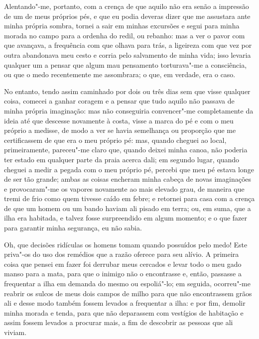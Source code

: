Alentando"-me, portanto, com a crença de que aquilo não era senão a
impressão de um de meus próprios pés, e que eu podia deveras dizer que
me assustara ante minha própria sombra, tornei a sair em minhas
excursões e segui para minha morada no campo para a ordenha do redil, ou
rebanho: mas a ver o pavor com que avançava, a frequência com que olhava
para trás, a ligeireza com que vez por outra abandonava meu cesto e
corria pelo salvamento de minha vida; isso levaria qualquer um a pensar
que algum mau pensamento torturava"-me a consciência, ou que o medo
recentemente me assombrara; o que, em verdade, era o caso.

No entanto, tendo assim caminhado por dois ou três dias sem que visse
qualquer coisa, comecei a ganhar coragem e a pensar que tudo aquilo não
passava de minha própria imaginação: mas não conseguiria convencer"-me
completamente da ideia até que descesse novamente à costa, visse a marca
do pé e com o meu próprio a medisse, de modo a ver se havia semelhança
ou proporção que me certificassem de que era o meu próprio pé: mas,
quando cheguei ao local, primeiramente, pareceu"-me claro que, quando
deixei minha canoa, não poderia ter estado em qualquer parte da praia
acerca dali; em segundo lugar, quando cheguei a medir a pegada com o meu
próprio pé, percebi que meu pé estava longe de ser tão grande; ambas as
coisas encheram minha cabeça de novas imaginações e provocaram"-me os
vapores novamente ao mais elevado grau, de maneira que tremi de frio
como quem tivesse caído em febre; e retornei para casa com a crença de
que um homem ou um bando haviam ali pisado em terra; ou, em suma, que a
ilha era habitada, e talvez fosse surpreendido em algum momento; e o que
fazer para garantir minha segurança, eu não sabia.

Oh, que decisões ridículas os homens tomam quando possuídos pelo medo!
Este priva"-os do uso dos remédios que a razão oferece para seu alívio. A
primeira coisa que pensei em fazer foi derrubar meus cercados e levar
todo o meu gado manso para a mata, para que o inimigo não o encontrasse
e, então, passasse a frequentar a ilha em demanda do mesmo ou
espoliá"-lo; em seguida, ocorreu"-me reabrir os sulcos de meus dois campos
de milho para que não encontrassem grãos ali e desse modo também fossem
levados a frequentar a ilha: e por fim, demolir minha morada e tenda,
para que não deparassem com vestígios de habitação e assim fossem
levados a procurar mais, a fim de descobrir as pessoas que ali viviam.

